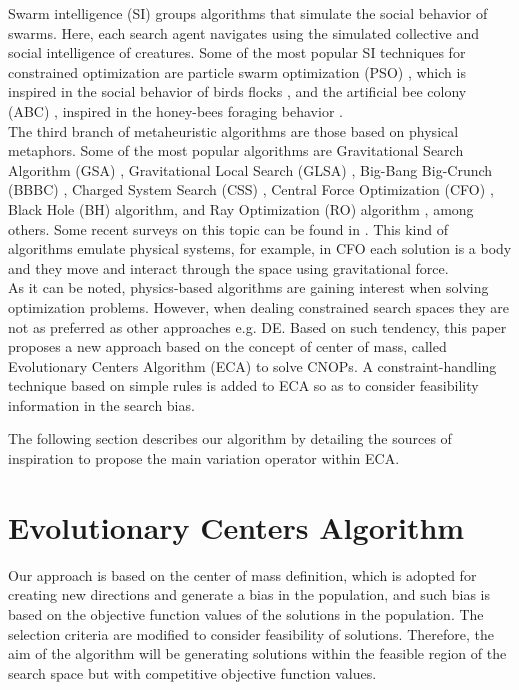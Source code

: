 \documentclass[conference]{IEEEtran}
\begin{document}
Swarm intelligence (SI) groups algorithms that simulate the social behavior of 
swarms. Here, each search agent navigates using the simulated collective and social 
intelligence of creatures. Some of the most popular SI techniques for constrained 
optimization are particle swarm optimization (PSO) \cite{Mezura11}, which is inspired 
in the social behavior of birds flocks \cite{pso1995}, and the artificial bee colony 
(ABC) \cite{Mezura11}, inspired in the honey-bees foraging behavior \cite{abc2005}.\\

The third branch of metaheuristic algorithms are those based on physical metaphors. 
Some of the most popular algorithms are Gravitational  Search Algorithm (GSA) \cite{rashedi2009gsa}, 
Gravitational Local Search (GLSA) \cite{glsa}, Big-Bang Big-Crunch (BBBC) \cite{erol2006new}, 
Charged System Search (CSS) \cite{kaveh2010novel}, Central Force Optimization 
(CFO) \cite{cfo2007}, Black Hole (BH) \cite{hatamlou2013black} algorithm, and Ray 
Optimization (RO) algorithm \cite{kaveh2012new}, among others. Some recent surveys 
on this topic can be found in \cite{fisicaSurvey,biswas2013physics,xie2011convergence,DBLP:journals/corr/FisterYFBF13}. 
This kind of algorithms emulate physical systems, for example, in CFO each solution 
is a body and they move and interact through the space using gravitational force.\\
% 

As it can be noted, physics-based algorithms are gaining interest when solving 
optimization problems. However, when dealing constrained search spaces they are 
not as preferred as other approaches e.g. DE. Based on such tendency, this paper 
proposes a new approach based on the concept of center of mass, called Evolutionary 
Centers Algorithm (ECA) to solve CNOPs. A constraint-handling technique based on 
simple rules is added to ECA so as to consider feasibility information in the 
search bias. 

The following section describes our algorithm by detailing the sources of inspiration 
to propose the main variation operator within ECA. 

\section{Evolutionary Centers Algorithm} %
\label{sec:eca}

Our approach is based on the center of mass definition, which is adopted for 
creating new directions and generate a bias in the population, and such bias is 
based on the objective function values of the solutions in the population. The 
selection criteria are modified to consider feasibility of solutions. Therefore, 
the aim of the algorithm will be generating solutions within the feasible region 
of the search space but with competitive objective function values.
\end{document}
